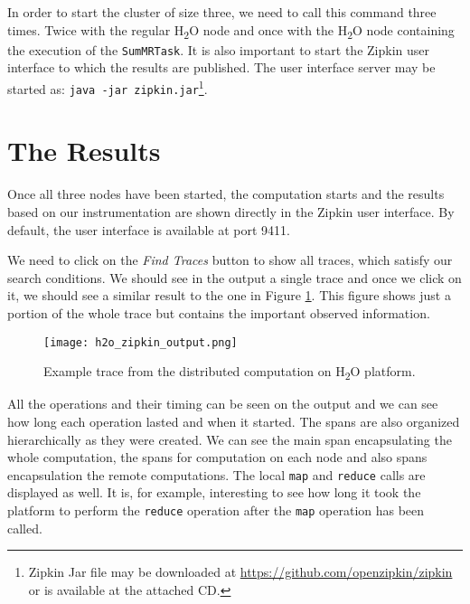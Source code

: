 In order to start the cluster of size three, we need to call this command three times. Twice with the regular H\textsubscript{2}O node and once with the H\textsubscript{2}O node containing the execution of the \texttt{SumMRTask}. It is also important to start the Zipkin user interface to which the results are published. The user interface server may be started as: \texttt{java -jar zipkin.jar}\footnote{Zipkin Jar file may be downloaded at \url{https://github.com/openzipkin/zipkin} or is available at the attached CD.}.
\section{The Results}
Once all three nodes have been started, the computation starts and the results based on our instrumentation are shown directly in the Zipkin user interface. By default, the user interface is available at port 9411.

We need to click on the \textit{Find Traces} button to show all traces, which satisfy our search conditions. We should see in the output a single trace and once we click on it, we should see a similar result to the one in Figure \ref{h2o_zipkin_output}. This figure shows just a portion of the whole trace but contains the important observed information.
	\begin{figure}
		\centering
		\texttt{[image: h2o\_zipkin\_output.png]}
		\caption{Example trace from the distributed computation on H\textsubscript{2}O platform.}
		\label{h2o_zipkin_output}
	\end{figure}

All the operations and their timing can be seen on the output and we can see how long each operation lasted and when it started. The spans are also organized hierarchically as they were created. We can see the main span encapsulating the whole computation, the spans for computation on each node and also spans encapsulation the remote computations. The local \texttt{map} and \texttt{reduce} calls are displayed as well. It is, for example, interesting to see how long it took the platform to perform the \texttt{reduce} operation after the \texttt{map} operation has been called.